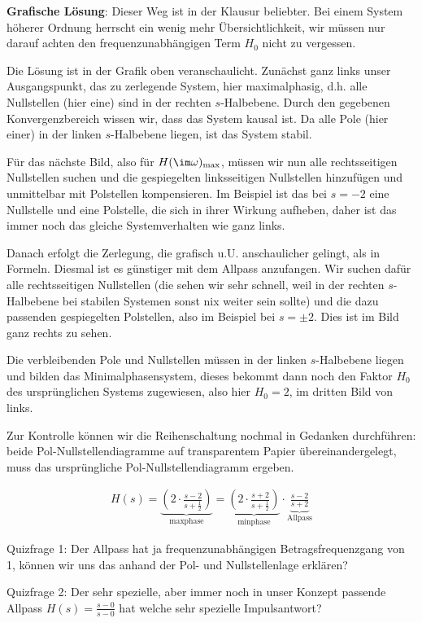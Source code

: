 \begin{ExCalc}
\textbf{Grafische Lösung}: Dieser Weg ist in der Klausur beliebter.
Bei einem System höherer Ordnung herrscht ein wenig mehr Übersichtlichkeit,
wir müssen nur darauf achten den frequenzunabhängigen Term $H_0$ nicht zu vergessen.

Die Lösung ist in der Grafik oben veranschaulicht. Zunächst ganz links unser
Ausgangspunkt, das zu zerlegende System, hier maximalphasig, d.h.
alle Nullstellen (hier eine) sind in der rechten $s$-Halbebene.
Durch den gegebenen Konvergenzbereich wissen wir, dass das System kausal ist.
Da alle Pole (hier einer) in der linken $s$-Halbebene liegen, ist das System
stabil.

Für das nächste Bild, also für $H(\im\omega)_\mathrm{max}$,
müssen wir nun alle rechtsseitigen Nullstellen
suchen und die gespiegelten linksseitigen Nullstellen hinzufügen und unmittelbar
mit Polstellen kompensieren.
Im Beispiel ist das bei $s=-2$ eine Nullstelle und eine Polstelle,
die sich in ihrer Wirkung aufheben, daher ist das immer noch das gleiche
Systemverhalten wie ganz links.

Danach erfolgt die Zerlegung, die grafisch u.U. anschaulicher gelingt, als in Formeln.
Diesmal ist es günstiger mit dem Allpass anzufangen.
Wir suchen dafür alle rechtsseitigen Nullstellen (die sehen wir sehr schnell, weil
in der rechten $s$-Halbebene bei stabilen Systemen sonst nix weiter sein sollte)
und die dazu passenden gespiegelten Polstellen, also im Beispiel bei $s=\pm 2$.
Dies ist im Bild ganz rechts zu sehen.

Die verbleibenden Pole und Nullstellen müssen in der linken $s$-Halbebene liegen und
bilden das Minimalphasensystem, dieses bekommt dann noch den Faktor $H_0$ des
ursprünglichen Systems zugewiesen, also hier $H_0=2$, im dritten Bild von links.

Zur Kontrolle können wir die Reihenschaltung nochmal in Gedanken durchführen:
beide Pol-Nullstellendiagramme auf transparentem Papier übereinandergelegt,
muss das ursprüngliche Pol-Nullstellendiagramm ergeben.

\end{ExCalc}


\begin{Loesung}
\begin{align}
H(s) =
\underbrace{\left(2\cdot\frac{s-2}{s+\frac{1}{2}}\right)}_{\mathrm{max phase}} =
\underbrace{\left(2\cdot\frac{s+2}{s+\frac{1}{2}}\right)}_{\mathrm{min phase}}
\cdot \underbrace{\frac{s-2}{s+2}}_{\mathrm{Allpass}}
\end{align}

Quizfrage 1: Der Allpass hat ja frequenzunabhängigen Betragsfrequenzgang von 1,
können wir uns das anhand der Pol- und Nullstellenlage erklären?

Quizfrage 2: Der sehr spezielle, aber immer noch in unser Konzept passende
Allpass $H(s) = \frac{s-0}{s-0}$ hat welche sehr spezielle Impulsantwort?
\end{Loesung}






